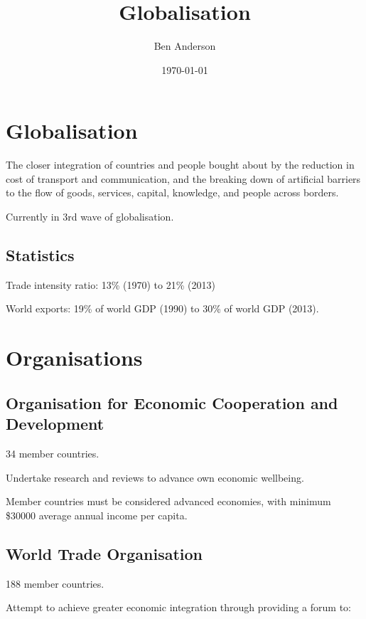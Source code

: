 \documentclass[a4paper,11pt]{article}
\begin{document}
\title{Globalisation}
\author{Ben Anderson}
\date{\today}
\maketitle
\pagebreak

\tableofcontents
\pagebreak


\section{Globalisation}

The closer integration of countries and people bought about by the reduction
in cost of transport and communication, and the breaking down of artificial
barriers to the flow of goods, services, capital, knowledge, and people
across borders.

Currently in 3rd wave of globalisation.


\subsection{Statistics}

Trade intensity ratio: 13\% (1970) to 21\% (2013)

World exports: 19\% of world GDP (1990) to 30\% of world GDP (2013).



\section{Organisations}

\subsection{Organisation for Economic Cooperation and Development}

34 member countries.

Undertake research and reviews to advance own economic wellbeing.

Member countries must be considered advanced economies, with minimum \$30000
average annual income per capita.


\subsection{World Trade Organisation}

188 member countries.

Attempt to achieve greater economic integration through providing a forum to:
\end{document}
